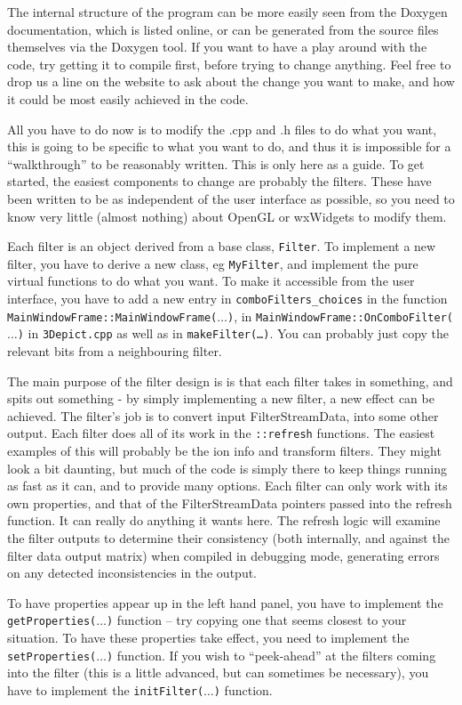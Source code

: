 \documentclass[10pt]{article}
\begin{document}
The internal structure of the program can be more easily seen from the Doxygen documentation, which is listed online, or can be generated from the source files themselves via the Doxygen tool. If you want to have a play around with the code, try getting it to compile first, before trying to change anything. Feel free to drop us a line on the website to ask about the change you want to make, and how it could be most easily achieved in the code.

All you have to do now is to modify the .cpp and .h files to do what you want, this is going to be specific to what you want to do, and thus it is impossible for a ``walkthrough'' to be reasonably written. This is only here as a guide. To get started, the easiest components to change are probably the filters. These have been written to be as independent of the user interface as possible, so you need to know very little (almost nothing) about OpenGL or wxWidgets to modify them. 

Each filter is an object derived from a base class, \texttt{Filter}.  To implement a new filter, you have to derive a new class, eg \texttt{MyFilter}, and implement the pure virtual functions to do what you want. To make it accessible from the user interface, you have to add a new entry in  \texttt{comboFilters\_choices} in the function \texttt{MainWindowFrame::MainWindowFrame($\ldots$)}, in \texttt{MainWindowFrame::OnComboFilter($\ldots$)} in \texttt{3Depict.cpp} as well as in \texttt{makeFilter(\ldots)}. You can probably just copy the relevant bits from a neighbouring filter.

The main purpose of the filter design is is that each filter takes in something, and spits out something - by simply implementing a new filter, a new effect can be achieved. The filter's job is to convert input FilterStreamData, into some other output.  Each filter does all of its work in the \texttt{::refresh} functions. The easiest examples of this will probably be the ion info and transform filters. They might look a bit daunting, but much of the code is simply there to keep things running as fast as it can, and to provide many options. Each filter can only work with its own properties, and that of the FilterStreamData pointers passed into the refresh function. It can really do anything it wants here. The refresh logic will examine the filter outputs to determine their consistency  (both internally, and against the filter data output matrix) when compiled in debugging mode, generating errors on any detected inconsistencies in the output.

To have properties appear up in the left hand panel, you have to implement the \texttt{getProperties($\ldots$)} function -- try copying one that seems closest to your situation. To have these properties take effect, you need to implement the \texttt{setProperties($\ldots$)} function. If you wish to ``peek-ahead'' at the filters coming into the filter (this is a little advanced, but can sometimes be necessary), you have to implement the \texttt{initFilter($\ldots$)} function.



\end{document}
